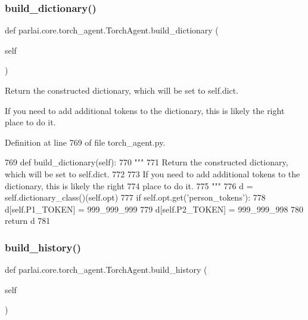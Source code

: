\subsubsection{\texorpdfstring{build\+\_\+dictionary()}{build\_dictionary()}}
{\footnotesize\ttfamily def parlai.\+core.\+torch\+\_\+agent.\+Torch\+Agent.\+build\+\_\+dictionary (\begin{DoxyParamCaption}\item[{}]{self }\end{DoxyParamCaption})}

\begin{DoxyVerb}Return the constructed dictionary, which will be set to self.dict.

If you need to add additional tokens to the dictionary, this is likely the right
place to do it.
\end{DoxyVerb}
 

Definition at line 769 of file torch\+\_\+agent.\+py.


\begin{DoxyCode}
769     \textcolor{keyword}{def }build\_dictionary(self):
770         \textcolor{stringliteral}{"""}
771 \textcolor{stringliteral}{        Return the constructed dictionary, which will be set to self.dict.}
772 \textcolor{stringliteral}{}
773 \textcolor{stringliteral}{        If you need to add additional tokens to the dictionary, this is likely the right}
774 \textcolor{stringliteral}{        place to do it.}
775 \textcolor{stringliteral}{        """}
776         d = self.dictionary\_class()(self.opt)
777         \textcolor{keywordflow}{if} self.opt.get(\textcolor{stringliteral}{'person\_tokens'}):
778             d[self.P1\_TOKEN] = 999\_999\_999
779             d[self.P2\_TOKEN] = 999\_999\_998
780         \textcolor{keywordflow}{return} d
781 
\end{DoxyCode}
\mbox{\label{classparlai_1_1core_1_1torch__agent_1_1TorchAgent_ab22f61f153b522f429210c61eed2d5af}} 
\subsubsection{\texorpdfstring{build\+\_\+history()}{build\_history()}}
{\footnotesize\ttfamily def parlai.\+core.\+torch\+\_\+agent.\+Torch\+Agent.\+build\+\_\+history (\begin{DoxyParamCaption}\item[{}]{self }\end{DoxyParamCaption})}

